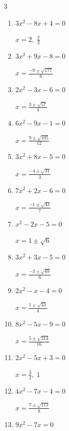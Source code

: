 \begin{multicols}{3}
\begin{enumerate}
        $\displaystyle x=\frac{-1\pm \sqrt{3}}{4}$

  \item $3x^{2}-8x+4=0$

        $\displaystyle x=2, \; \frac{2}{3}$

  \item $3x^{2}+9x-8=0$

        $\displaystyle x=\frac{-9\pm \sqrt{177}}{6}$

  \item $2x^{2}-3x-6=0$

        $\displaystyle x=\frac{3\pm \sqrt{57}}{4}$

  \item $6x^{2}-9x-1=0$

        $\displaystyle x=\frac{9\pm \sqrt{105}}{12}$

  \item $3x^{2}+8x-5=0$

        $\displaystyle x=\frac{-4\pm \sqrt{31}}{3}$

  \item $7x^{2}+2x-6=0$

        $\displaystyle x=\frac{-1\pm \sqrt{43}}{7}$

\columnbreak %

\resetques

  \item $x^{2}-2x-5=0$

        $\displaystyle x=1\pm \sqrt{6}$

  \item $3x^{2}+3x-5=0$

        $\displaystyle x=\frac{-3\pm \sqrt{69}}{6}$

  \item $2x^{2}-x-4=0$

        $\displaystyle x=\frac{1\pm \sqrt{33}}{4}$

  \item $8x^{2}-5x-9=0$

        $\displaystyle x=\frac{5\pm \sqrt{313}}{16}$

  \item $2x^{2}-5x+3=0$

        $\displaystyle x=\frac{3}{2}, \; 1$

  \item $4x^{2}-7x-4=0$

        $\displaystyle x=\frac{7\pm \sqrt{113}}{8}$

  \item $9x^{2}-7x=0$


\end{enumerate}
\end{multicols}
